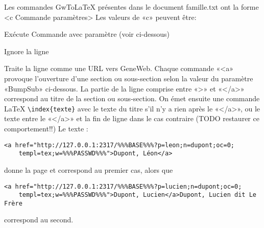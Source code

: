 Les commandes GwToLaTeX présentes dans le document famille.txt ont la forme
<c Commande paramètres>
Les valeurs de «c» peuvent être:
\begin{description}[style=nextline]
\item[x] Exécute Commande avec paramètre (voir ci-dessous)
\item[y] Ignore la ligne
\item[a] Traite la ligne comme une URL vers GeneWeb. 
Chaque commande «<a» provoque l'ouverture d'une section ou sous-section selon
la valeur du paramètre «BumpSub» ci-dessous. La partie de la ligne comprise entre
«>» et «</a>» correspond au titre de la section ou sous-section.
On émet ensuite une commande LaTeX \verb|\index{texte}| avec le texte du titre s'il
n'y a rien après le «</a>», ou le texte entre le «</a>» et la fin de ligne
dans le cas contraire (TODO restaurer ce comportement!!)
Le texte :
\begin{verbatim}
<a href="http://127.0.0.1:2317/%%%BASE%%%?p=leon;n=dupont;oc=0;
    templ=tex;w=%%%PASSWD%%%">Dupont, Léon</a>
\end{verbatim}
donne la page \pageref{section1} et correspond au premier cas, alors que 
\begin{verbatim}
<a href="http://127.0.0.1:2317/%%%BASE%%%?p=lucien;n=dupont;oc=0;
    templ=tex;w=%%%PASSWD%%%">Dupont, Lucien</a>Dupont, Lucien dit Le Frère
\end{verbatim}
correspond au second.
\end{description}

